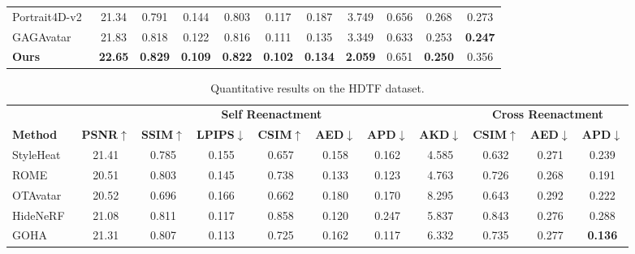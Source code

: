 \begin{table*}[ht]
\begin{tabular}{l|ccccccc|ccc}
        Portrait4D-v2~\citep{deng2024portrait4d2}   & {21.34} & {0.791} & {0.144} & {0.803} & {0.117} & 0.187      & {3.749} & {0.656} & 0.268      & 0.273      \\
        GAGAvatar~\cite{GAGAvatar} & 21.83 & 0.818 & 0.122 & 0.816 & 0.111 & 0.135 & 3.349 & 0.633 & 0.253 & \textbf{0.247} \\
        \midrule
        \textbf{Ours} & \textbf{22.65} & \textbf{0.829} & \textbf{0.109} & \textbf{0.822} & \textbf{0.102} & \textbf{0.134} & \textbf{2.059} & {0.651} & \textbf{0.250} & {0.356} \\
        \bottomrule
    \end{tabular}
    \vspace{-.05in}
\end{table*}

\begin{table*}[h]
\centering
\caption{Quantitative results on the HDTF dataset.}
\label{tab:results_hdtf}
    \vspace{-.05in}
\begin{tabular}{l|ccccccc|ccc}
\toprule
& \multicolumn{7}{c|}{\textbf{Self Reenactment}} & \multicolumn{3}{c}{\textbf{Cross Reenactment}} \\
\textbf{Method} & \textbf{PSNR$\uparrow$} & \textbf{SSIM$\uparrow$} & \textbf{LPIPS$\downarrow$} & \textbf{CSIM$\uparrow$} & \textbf{AED$\downarrow$} & \textbf{APD$\downarrow$} & \textbf{AKD$\downarrow$} & \textbf{CSIM$\uparrow$} & \textbf{AED$\downarrow$} & \textbf{APD$\downarrow$} \\ 
\midrule
StyleHeat~\citep{styleheat2022}             & 21.41      & 0.785      & 0.155      & 0.657      & 0.158      & 0.162      & 4.585      & 0.632      & 0.271      & 0.239      \\
        ROME~\citep{rome2022}                       & 20.51      & 0.803      & 0.145      & 0.738      & 0.133      & {0.123} & 4.763      & 0.726      & 0.268      & 0.191      \\
        OTAvatar~\citep{otavatar2023}               & 20.52      & 0.696      & 0.166      & 0.662      & 0.180      & 0.170      & 8.295      & 0.643      & 0.292      & 0.222      \\
        HideNeRF~\citep{hidenerf2023}               & 21.08      & 0.811      & 0.117      & {0.858} & 0.120      & 0.247      & 5.837      & 0.843      & 0.276      & 0.288      \\
        GOHA~\citep{goha2023}                       & 21.31      & 0.807      & 0.113      & 0.725      & 0.162      & {0.117} & 6.332      & 0.735      & 0.277      & \textbf{0.136} \\

\end{tabular}
\end{table*}
